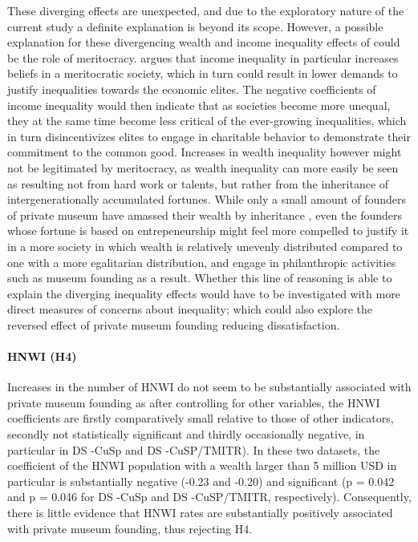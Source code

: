 \documentclass[11pt]{article}
\begin{document}
These diverging effects are unexpected, and due to the exploratory nature of the current study a definite explanation is beyond its scope. 
However, a possible explanation for these divergencing wealth and income inequality effects of could be the role of meritocracy.
\textcite{Mijs_2019_paradox} argues that income inequality in particular increases beliefs in a meritocratic society, which in turn could result in lower demands to justify inequalities towards the economic elites.
The negative coefficients of income inequality would then indicate that as societies become more unequal, they at the same time become less critical of the ever-growing inequalities, which in turn disincentivizes elites to engage in charitable behavior to demonstrate their commitment to the common good. 
Increases in wealth inequality however might not be legitimated by meritocracy, as wealth inequality can more easily be seen as resulting not from hard work or talents, but rather from the inheritance of intergenerationally accumulated fortunes.
While only a small amount of founders of private museum have amassed their wealth by inheritance \parencite{Velthuis_etal_2023_boom}, even the founders whose fortune is based on entrepeneurship might feel more compelled to justify it in a more society in which wealth is relatively unevenly distributed compared to one with a more egalitarian distribution, and engage in philanthropic activities such as museum founding as a result.
Whether this line of reasoning is able to explain the diverging inequality effects would have to be investigated with more direct measures of concerns about inequality; which could also explore the reversed effect of private museum founding reducing dissatisfaction.




\paragraph*{HNWI (H4)}


Increases in the number of HNWI do not seem to be substantially associated with private museum founding as after controlling for other variables, the HNWI coefficients are firstly comparatively small relative to those of other indicators, secondly not statistically significant and thirdly occasionally negative, in particular in DS -CuSp and DS -CuSP/TMITR).
In these two datasets, the coefficient of the HNWI population with a wealth larger than 5 million USD in particular is substantially negative (-0.23 and -0.20) and significant (p = 0.042 and p = 0.046 for DS -CuSp and DS -CuSP/TMITR, respectively).
Consequently, there is little evidence that HNWI rates are substantially positively associated with private museum founding, thus rejecting H4.
\end{document}
